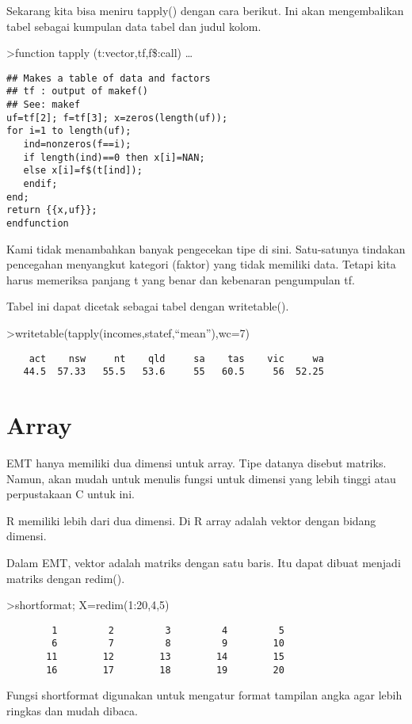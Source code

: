 \documentclass[
]{book}
\begin{document}
Sekarang kita bisa meniru tapply() dengan cara berikut. Ini akan mengembalikan tabel sebagai kumpulan data tabel dan judul kolom.

\textgreater function tapply (t:vector,tf,f\$:call) \ldots{}

\begin{verbatim}
## Makes a table of data and factors
## tf : output of makef()
## See: makef
uf=tf[2]; f=tf[3]; x=zeros(length(uf));
for i=1 to length(uf);
   ind=nonzeros(f==i);
   if length(ind)==0 then x[i]=NAN;
   else x[i]=f$(t[ind]);
   endif;
end;
return {{x,uf}};
endfunction
\end{verbatim}

Kami tidak menambahkan banyak pengecekan tipe di sini. Satu-satunya tindakan pencegahan menyangkut kategori (faktor) yang tidak memiliki data. Tetapi kita harus memeriksa panjang t yang benar dan kebenaran pengumpulan tf.

Tabel ini dapat dicetak sebagai tabel dengan writetable().

\textgreater writetable(tapply(incomes,statef,``mean''),wc=7)

\begin{verbatim}
    act    nsw     nt    qld     sa    tas    vic     wa
   44.5  57.33   55.5   53.6     55   60.5     56  52.25
\end{verbatim}

\chapter{Array}\label{array}

EMT hanya memiliki dua dimensi untuk array. Tipe datanya disebut matriks. Namun, akan mudah untuk menulis fungsi untuk dimensi yang lebih tinggi atau perpustakaan C untuk ini.

R memiliki lebih dari dua dimensi. Di R array adalah vektor dengan bidang dimensi.

Dalam EMT, vektor adalah matriks dengan satu baris. Itu dapat dibuat menjadi matriks dengan redim().

\textgreater shortformat; X=redim(1:20,4,5)

\begin{verbatim}
        1         2         3         4         5 
        6         7         8         9        10 
       11        12        13        14        15 
       16        17        18        19        20 
\end{verbatim}

Fungsi shortformat digunakan untuk mengatur format tampilan angka agar lebih ringkas dan mudah dibaca.
\end{document}
